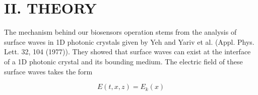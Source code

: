 \section*{II. THEORY}
\hspace{0.5in}
The mechanism behind our biosensors operation stems from the analysis of surface waves in 1D photonic crystals given by Yeh and Yariv et al. (Appl. Phys. Lett. 32, 104 (1977)). They showed that surface waves can exist at the interface of a 1D photonic crystal and its bounding medium. The electric field of these surface waves takes the form 

\[
    E(t,x,z) = E_k(x)
\]
